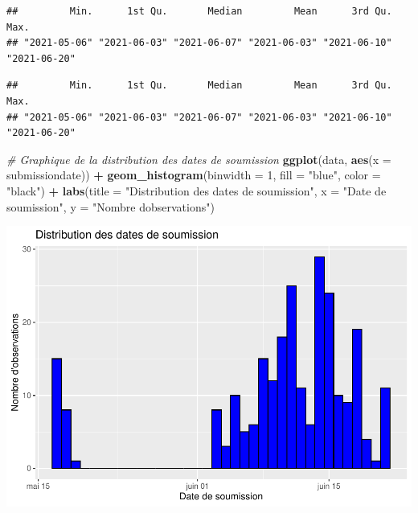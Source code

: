 \documentclass[
]{article}
\newenvironment{Shaded}{\begin{snugshade}}{\end{snugshade}}
\newcommand{\AttributeTok}[1]{\textcolor[rgb]{0.13,0.29,0.53}{#1}}
\newcommand{\CommentTok}[1]{\textcolor[rgb]{0.56,0.35,0.01}{\textit{#1}}}
\newcommand{\DecValTok}[1]{\textcolor[rgb]{0.00,0.00,0.81}{#1}}
\newcommand{\FunctionTok}[1]{\textcolor[rgb]{0.13,0.29,0.53}{\textbf{#1}}}
\newcommand{\NormalTok}[1]{#1}
\newcommand{\SpecialCharTok}[1]{\textcolor[rgb]{0.81,0.36,0.00}{\textbf{#1}}}
\newcommand{\StringTok}[1]{\textcolor[rgb]{0.31,0.60,0.02}{#1}}
\begin{document}
\begin{verbatim}
##         Min.      1st Qu.       Median         Mean      3rd Qu.         Max. 
## "2021-05-06" "2021-06-03" "2021-06-07" "2021-06-03" "2021-06-10" "2021-06-20"
\end{verbatim}

\begin{Shaded}
\end{Shaded}

\begin{verbatim}
##         Min.      1st Qu.       Median         Mean      3rd Qu.         Max. 
## "2021-05-06" "2021-06-03" "2021-06-07" "2021-06-03" "2021-06-10" "2021-06-20"
\end{verbatim}

\begin{Shaded}
\begin{Highlighting}[]
\CommentTok{\# Graphique de la distribution des dates de soumission}
\FunctionTok{ggplot}\NormalTok{(data, }\FunctionTok{aes}\NormalTok{(}\AttributeTok{x =}\NormalTok{ submissiondate)) }\SpecialCharTok{+}
  \FunctionTok{geom\_histogram}\NormalTok{(}\AttributeTok{binwidth =} \DecValTok{1}\NormalTok{, }\AttributeTok{fill =} \StringTok{"blue"}\NormalTok{, }\AttributeTok{color =} \StringTok{"black"}\NormalTok{) }\SpecialCharTok{+}
  \FunctionTok{labs}\NormalTok{(}\AttributeTok{title =} \StringTok{"Distribution des dates de soumission"}\NormalTok{,}
       \AttributeTok{x =} \StringTok{"Date de soumission"}\NormalTok{,}
       \AttributeTok{y =} \StringTok{"Nombre d\textquotesingle{}observations"}\NormalTok{)}
\end{Highlighting}
\end{Shaded}

\includegraphics{RMarkdown_files/figure-latex/unnamed-chunk-13-1.pdf}
\end{document}
